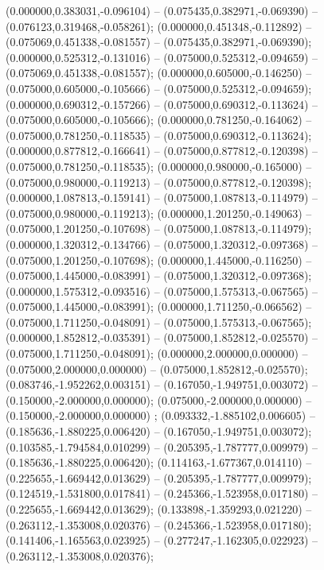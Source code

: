  (0.000000,0.383031,-0.096104) -- (0.075435,0.382971,-0.069390) -- (0.076123,0.319468,-0.058261);
 (0.000000,0.451348,-0.112892) -- (0.075069,0.451338,-0.081557) -- (0.075435,0.382971,-0.069390);
 (0.000000,0.525312,-0.131016) -- (0.075000,0.525312,-0.094659) -- (0.075069,0.451338,-0.081557);
 (0.000000,0.605000,-0.146250) -- (0.075000,0.605000,-0.105666) -- (0.075000,0.525312,-0.094659);
 (0.000000,0.690312,-0.157266) -- (0.075000,0.690312,-0.113624) -- (0.075000,0.605000,-0.105666);
 (0.000000,0.781250,-0.164062) -- (0.075000,0.781250,-0.118535) -- (0.075000,0.690312,-0.113624);
 (0.000000,0.877812,-0.166641) -- (0.075000,0.877812,-0.120398) -- (0.075000,0.781250,-0.118535);
 (0.000000,0.980000,-0.165000) -- (0.075000,0.980000,-0.119213) -- (0.075000,0.877812,-0.120398);
 (0.000000,1.087813,-0.159141) -- (0.075000,1.087813,-0.114979) -- (0.075000,0.980000,-0.119213);
 (0.000000,1.201250,-0.149063) -- (0.075000,1.201250,-0.107698) -- (0.075000,1.087813,-0.114979);
 (0.000000,1.320312,-0.134766) -- (0.075000,1.320312,-0.097368) -- (0.075000,1.201250,-0.107698);
 (0.000000,1.445000,-0.116250) -- (0.075000,1.445000,-0.083991) -- (0.075000,1.320312,-0.097368);
 (0.000000,1.575312,-0.093516) -- (0.075000,1.575313,-0.067565) -- (0.075000,1.445000,-0.083991);
 (0.000000,1.711250,-0.066562) -- (0.075000,1.711250,-0.048091) -- (0.075000,1.575313,-0.067565);
 (0.000000,1.852812,-0.035391) -- (0.075000,1.852812,-0.025570) -- (0.075000,1.711250,-0.048091);
 (0.000000,2.000000,0.000000) -- (0.075000,2.000000,0.000000) -- (0.075000,1.852812,-0.025570);
 (0.083746,-1.952262,0.003151) -- (0.167050,-1.949751,0.003072) -- (0.150000,-2.000000,0.000000);
 (0.075000,-2.000000,0.000000) -- (0.150000,-2.000000,0.000000) ;
 (0.093332,-1.885102,0.006605) -- (0.185636,-1.880225,0.006420) -- (0.167050,-1.949751,0.003072);
 (0.103585,-1.794584,0.010299) -- (0.205395,-1.787777,0.009979) -- (0.185636,-1.880225,0.006420);
 (0.114163,-1.677367,0.014110) -- (0.225655,-1.669442,0.013629) -- (0.205395,-1.787777,0.009979);
 (0.124519,-1.531800,0.017841) -- (0.245366,-1.523958,0.017180) -- (0.225655,-1.669442,0.013629);
 (0.133898,-1.359293,0.021220) -- (0.263112,-1.353008,0.020376) -- (0.245366,-1.523958,0.017180);
 (0.141406,-1.165563,0.023925) -- (0.277247,-1.162305,0.022923) -- (0.263112,-1.353008,0.020376);
